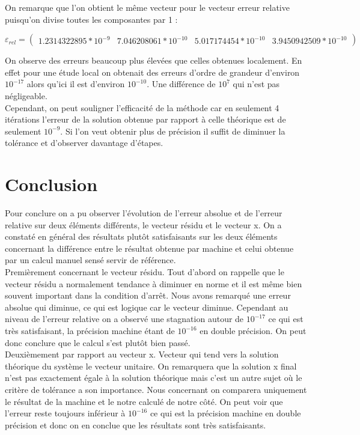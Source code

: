 \documentclass[12,french]{report}
\begin{document}
On remarque que l'on obtient le même vecteur pour le vecteur erreur relative puisqu'on divise toutes les composantes par 1 :

$$\varepsilon_{rel}=\left(\begin{array}{cccc}
1.2314322895*10^{-9} & 7.046208061*10^{-10} & 5.017174454*10^{-10} & 3.9450942509*10^{-10} \end{array}\right)$$

On observe des erreurs beaucoup plus élevées que celles obtenues localement. En effet pour une étude local on obtenait des erreurs d'ordre de grandeur d'environ $10^{-17}$ alors qu'ici il est d'environ $10^{-10}$. Une différence de $10^{7}$ qui n'est pas négligeable.\\

Cependant, on peut souligner l'efficacité de la méthode car en seulement 4 itérations l'erreur de la solution obtenue par rapport à celle théorique est de seulement $10^{-9}$. Si l'on veut obtenir plus de précision il suffit de diminuer la tolérance et d'observer davantage d'étapes.





\chapter*{Conclusion} %

Pour conclure on a pu observer l'évolution de l'erreur absolue et de l'erreur relative sur deux éléments différents, le vecteur résidu et le vecteur x. On a constaté en général des résultats plutôt satisfaisants sur les deux éléments concernant la différence entre le résultat obtenue par machine et celui obtenue par un calcul manuel sensé servir de référence.\\

Premièrement concernant le vecteur résidu. Tout d'abord on rappelle que le vecteur résidu a normalement tendance à diminuer en norme et il est même bien souvent important dans la condition d'arrêt. Nous avons remarqué une erreur absolue qui diminue, ce qui est logique car le vecteur diminue. Cependant au niveau de l'erreur relative on a observé une stagnation autour de $10^{-17}$ ce qui est très satisfaisant, la précision machine étant de $10^{-16}$ en double précision. On peut donc conclure que le calcul s'est plutôt bien passé.\\

Deuxièmement par rapport au vecteur x. Vecteur qui tend vers la solution théorique du système le vecteur unitaire. On remarquera que la solution x final n'est pas exactement égale à la solution théorique mais c'est un autre sujet où le critère de tolérance a son importance. Nous concernant on comparera uniquement le résultat de la machine et le notre calculé de notre côté. On peut voir que l'erreur reste toujours inférieur à $10^{-16}$ ce qui est la précision machine en double précision et donc on en conclue que les résultats sont très satisfaisants. \\
\end{document}

